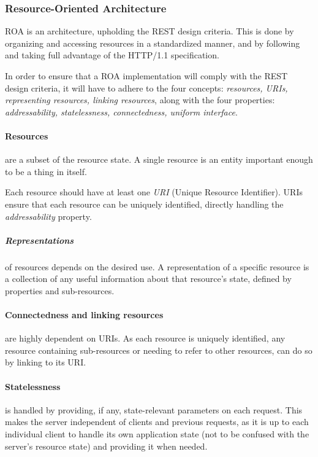 \subsubsection{Resource-Oriented Architecture}
ROA is an architecture, upholding the REST design criteria.
This is done by organizing and accessing resources in a standardized manner, and by following and taking full advantage of the HTTP/1.1 specification.

In order to ensure that a ROA implementation will comply with the REST design criteria, it will have to adhere to the four concepts: \textit{resources, URIs, representing resources, linking resources}, along with the four properties: \textit{addressability, statelessness, connectedness, uniform interface}.\cite[Chapter 4]{restful_web_services}

\paragraph{Resources} are a subset of the resource state.
A single resource is an entity important enough to be a thing in itself.

Each resource should have at least one \textit{URI} (Unique Resource Identifier).
URIs ensure that each resource can be uniquely identified, directly handling the \textit{addressability} property.

\subparagraph{Representations} of resources depends on the desired use.
A representation of a specific resource is a collection of any useful information about that resource's state, defined by properties and sub-resources.

\paragraph{Connectedness and linking resources} are highly dependent on URIs.
As each resource is uniquely identified, any resource containing sub-resources or needing to refer to other resources, can do so by linking to its URI. 

\paragraph{Statelessness} is handled by providing, if any, state-relevant parameters on each request.
This makes the server independent of clients and previous requests, as it is up to each individual client to handle its own application state (not to be confused with the server's resource state) and providing it when needed.


